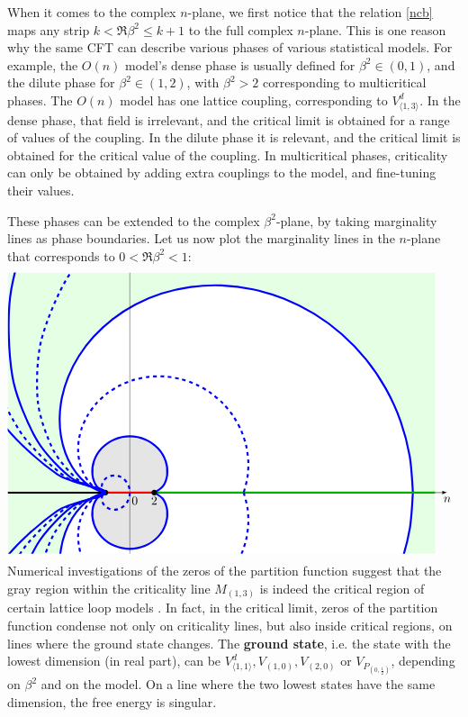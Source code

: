 \documentclass[12pt, a4paper]{article}
\theoremstyle{break}
\begin{document}
When it comes to the complex $n$-plane, we first notice that the relation \eqref{ncb} maps any strip $k<\Re \beta^2\leq k+1$ to the full complex $n$-plane. 
This is one reason why the same CFT can describe various phases of various statistical models. For example, the $O(n)$ model's dense phase is usually defined for $\beta^2\in (0,1)$, and the dilute phase for $\beta^2\in (1,2)$, with $\beta^2>2$ corresponding to multicritical phases. The $O(n)$ model has one lattice coupling, corresponding to $V^d_{\langle 1,3\rangle}$. In the dense phase, that field is irrelevant, and the critical limit is obtained for a range of values of the coupling. In the dilute phase it is relevant, and the critical limit is obtained for the critical value of the coupling. In multicritical phases, criticality can only be obtained by adding extra couplings to the model, and fine-tuning their values. 

These phases can be extended to the complex $\beta^2$-plane, by taking marginality lines as phase boundaries. Let us now plot the marginality lines in the $n$-plane that corresponds to $0<\Re \beta^2<1$:
\newcommand{\margs}[2]{
\draw[domain = {-2/(#1-1)}:{2/(#1-1)}, smooth, variable = \t, #2]
plot({-2*cos(pi/2*(#1-1)*\t r)*cosh(pi/2*(#1-1)*sqrt(abs(\t)-\t*\t)}, {2*sin(pi/2*(#1-1)*\t r)*sinh(pi/2*(#1-1)*sqrt(abs(\t)-\t*\t)});
}
\begin{align}
 \begin{tikzpicture}[baseline=(current  bounding  box.center), scale = .35]
\clip (-10, 18) -- (27, 18) -- (27, -5) -- (-10, -5) -- cycle;
\fill [color = green!10] (-10, 18) -- (25, 18) -- (25, -5) -- (-10, -5) -- cycle;
\margs{5}{ultra thick, blue, samples = 50, fill = white}
\margs{3}{ultra thick, blue, fill = black!10}
\draw[-latex] (-10, 0) -- (26, 0) node[below]{$n$};
\draw (0, -5) -- (0, 18);
\draw[ultra thick, green!70!black] (2, 0) -- (25, 0);
\draw [ultra thick] (-10, 0) -- (-2, 0);
\draw [ultra thick, red] (-2, 0) -- (2, 0); 
\node[below right] at (-.2, 0) {$0$};
\node[below] at (2, 0) {$2$};
\node at (2, 0) [fill, circle, scale = .5] {};
\node at (-2, 0) [fill, circle, scale = .5] {};
 \draw[domain = 0:360, smooth, variable = \t, samples = 30, ultra thick, dashed, blue]
   plot({-2*sin(pi*(1+cos(\t))/4 r)*cosh(pi*sin(\t)/4)}, {2*cos(pi*(1+cos(\t))/4 r)*sinh(pi*sin(\t)/4)});
 \margs{4}{ultra thick, dashed, blue, samples = 50}
\margs{6}{ultra thick, dashed, blue}
\margs{7}{ultra thick, blue}
\margs{8}{ultra thick, dashed, blue}
\margs{9}{ultra thick, blue}
\end{tikzpicture}
\end{align}
Numerical investigations of the zeros of the partition function suggest that the gray region within the criticality line $M_{(1,3)}$ is indeed the critical region of certain lattice loop models \cite{bjjz22}. 
In fact, in the critical limit, zeros of the partition function condense not only on criticality lines, but also inside critical regions, on lines where the ground state changes. The \textbf{ground state}, i.e. the state with the lowest dimension (in real part), can be $V^d_{\langle 1,1\rangle}, V_{(1, 0)}, V_{(2,0)}$ or $V_{P_{(0,\frac12)}}$, depending on $\beta^2$ and on the model. On a line where the two lowest states have the same dimension, the free energy is singular. 
\end{document}
